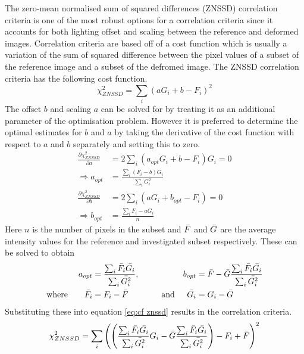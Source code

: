 \documentclass[[12pt,oneside,openany,a4paper, %
\newcommand*\mean[1]{\bar{#1}} %
\begin{document}
The zero-mean normalised sum of squared differences (ZNSSD) correlation criteria is one of the most robust options for a correlation criteria since it accounts for both lighting offset and scaling between the reference and deformed images. Correlation criteria are based off of a cost function which is usually a variation of the sum of squared difference between the pixel values of a subset of the reference image and a subset of the defromed image. The ZNSSD correlation criteria has the following cost function.
\begin{equation}
\label{eq:cf znssd}
  \chi_{ZNSSD}^2 = \sum_i \left( a G_i + b - F_i \right) ^2
\end{equation}
The offset $b$ and scaling $a$ can be solved for by treating it as an additional parameter of the optimisation problem. However it is preferred to determine the optimal estimates for $b$ and $a$ by taking the derivative of the cost function with respect to $a$ and $b$ separately and setting this to zero.
\begin{align}
  \frac{\partial \chi_{ZNSSD}^2 }{\partial a} &= 2 \sum_i \left( a_{opt} G_i + b- F_i \right) G_i = 0\\
  \Rightarrow a_{opt} &= \frac{\sum_i \left( F_i - b \right) G_i}{\sum_i G_i^2} \\
  \frac{\partial \chi_{ZNSSD}^2 }{\partial b} &= 2 \sum_i \left( a G_i + b_{opt} - F_i \right) = 0\\
  \Rightarrow b_{opt} &= \frac{\sum_i F_i -a G_i}{n}
\end{align}
Here $n$ is the number of pixels in the subset and $\mean{F}$ and $\mean{G}$  are the average intensity values for the reference and investigated subset respectively. These can be solved to obtain
\begin{align}
  a_{opt} &= \frac{\sum_i \mean{F_i} \mean{G_i}}{\sum_i \mean{G_i^2}}, &b_{opt}&= \mean{F} -\mean{G} \frac{\sum_i \mean{F_i} \mean{G_i}}{\sum_i \mean{G_i^2}} \\
  \text{where} \quad \quad \mean{F_i} &= F_i - \mean{F} \quad \quad \quad \quad \text{and} & \mean{G_i} &= G_i -\mean{G}
\end{align}
Substituting these into equation \ref{eq:cf znssd} results in the correlation criteria.
\begin{equation}
  \chi_{ZNSSD}^2 = \sum_i \left( \left( \frac{\sum_i \mean{F_i} \mean{G_i}}{\sum_i \mean{G_i^2}} G_i - \mean{G} \frac{\sum_i \mean{F_i} \mean{G_i}}{\sum_i \mean{G_i^2}} \right) - F_i + \mean{F} \right) ^2
\end{equation} 
\end{document}
